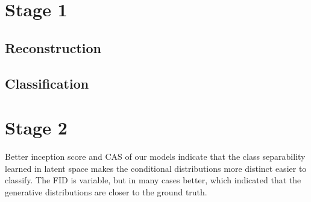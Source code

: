 \documentclass[../../thesis.tex]{subfiles}
\begin{document}
\section{Stage 1}

\subsection{Reconstruction}



\subsection{Classification}
\section{Stage 2}

Better inception score and CAS of our models indicate that the class separability learned in latent space makes the conditional distributions more distinct easier to classify. The FID is variable, but in many cases better, which indicated that the generative distributions are closer to the ground truth.
\end{document}
